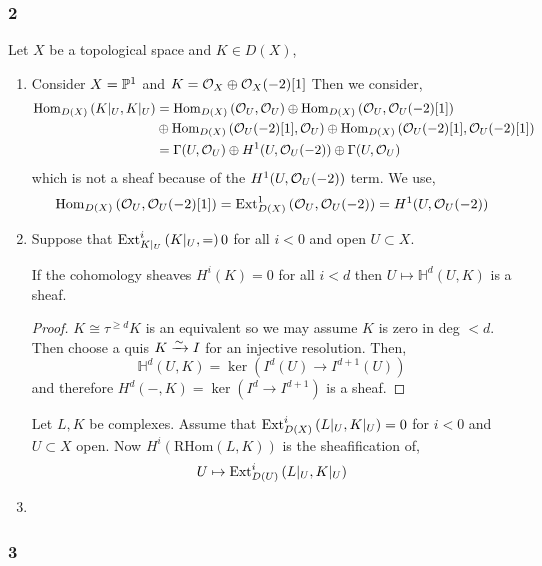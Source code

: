 \documentclass[12pt]{article}
\begin{document}
\subsubsection*{2}

Let $X$ be a topological space and $K \in D(X)$,

\begin{enumerate}
\item Consider $X = \P^1$ and $K = \struct{X} \oplus \struct{X}(-2)[1]$ Then we consider,
\begin{align*}
\Hom{D(X)}{K|_U}{K|_U} & = \Hom{D(X)}{\struct{U}}{\struct{U}} \oplus \Hom{D(X)}{\struct{U}}{\struct{U}(-2)[1]}
\\
& \oplus \Hom{D(X)}{\struct{U}(-2)[1]}{\struct{U}} \oplus \Hom{D(X)}{\struct{U}(-2)[1]}{\struct{U}(-2)[1]}
\\
& = \Gamma(U, \struct{U}) \oplus H^1(U, \struct{U}(-2)) \oplus \Gamma(U, \struct{U})
\end{align*} 
which is not a sheaf because of the $H^1(U, \struct{U}(-2))$ term. We use,
\[ \Hom{D(X)}{\struct{U}}{\struct{U}(-2)[1]} = \Ext{1}{D(X)}{\struct{U}}{\struct{U}(-2)} = H^1(U, \struct{U}(-2)) \]
\item Suppose that $\Ext{i}{K|_U}{K|_U} = 0$ for all $i < 0$ and open $U \subset X$.

\begin{lemma}
If the cohomology sheaves $H^i(K) = 0$ for all $i < d$ then $U \mapsto \mathbb{H}^d(U, K)$ is a sheaf.
\end{lemma}
 
\begin{proof}
$K \cong \tau^{\ge d} K$ is an equivalent so we may assume $K$ is zero in deg $< d$. Then choose a quis $K \iso I$ for an injective resolution. Then,
\[ \mathbb{H}^d(U, K) = \ker{(I^d(U) \to I^{d+1}(U))} \]
and therefore $H^d(-, K) = \ker{(I^d \to I^{d+1})}$ is a sheaf.
\end{proof} 
\noindent
Let $L,K$ be complexes. Assume that $\Ext{i}{D(X)}{L|_U}{K|_U} = 0$ for $i < 0$ and $U \subset X$ open. Now $H^i(\mathrm{RHom}(L,K))$ is the sheafification of,
\[ U \mapsto \Ext{i}{D(U)}{L|_U}{K|_U} \]

\item 
\end{enumerate}

\subsubsection*{3}
\end{document}
